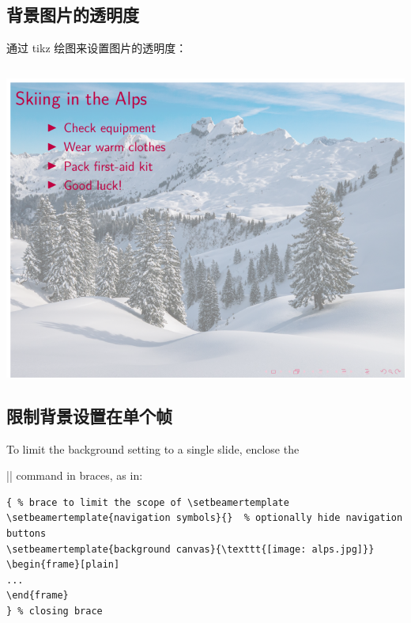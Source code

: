\begin{column}{0.5\textwidth}
\subsection{背景图片的透明度}

通过 tikz 绘图来设置图片的透明度：

\inputminted[linenos=true]{latex}{examples/beamer/beamertheme11.tex}

\includegraphics{examples/beamer/beamertheme11.pdf}

\subsection{限制背景设置在单个帧}

To limit the background setting to a single slide, enclose the 

||
command in braces, as in:

\begin{verbatim}
{ % brace to limit the scope of \setbeamertemplate 
\setbeamertemplate{navigation symbols}{}  % optionally hide navigation buttons 
\setbeamertemplate{background canvas}{\texttt{[image: alps.jpg]}} 
\begin{frame}[plain] 
... 
\end{frame} 
} % closing brace 
\end{verbatim}


\end{column}

